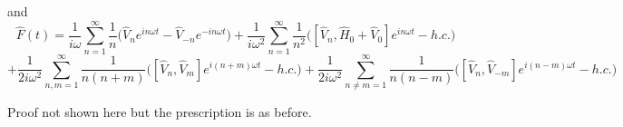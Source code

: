  and\\
 
 $$ \hat{F}(t)= \frac{1}{i\omega}\displaystyle\sum_{n=1}^{\infty}\frac{1}{n}\biggl(\hat{V}_ne^{in\omega t}-\hat{V}_{-n}e^{-in\omega t}\biggr) +
 \frac{1}{i\omega^2}\displaystyle\sum_{n=1}^{\infty}\frac{1}{n^2}\biggl([\hat{V}_n,\hat{H}_0+\hat{V}_0]e^{in\omega t}-h.c.\biggr)$$
 $$ +\frac{1}{2i\omega^2}\displaystyle\sum_{n,m=1}^{\infty}\frac{1}{n(n+m)}\biggl([\hat{V}_n,\hat{V}_m]e^{i(n+m)\omega t}-h.c.\biggr)
 + \frac{1}{2i\omega^2}\displaystyle\sum_{n\neq m=1}^{\infty}\frac{1}{n(n-m)}\biggl([\hat{V}_n,\hat{V}_{-m}]e^{i(n-m)\omega t}-h.c.\biggr)$$
 
 Proof not shown here but the prescription is as before.